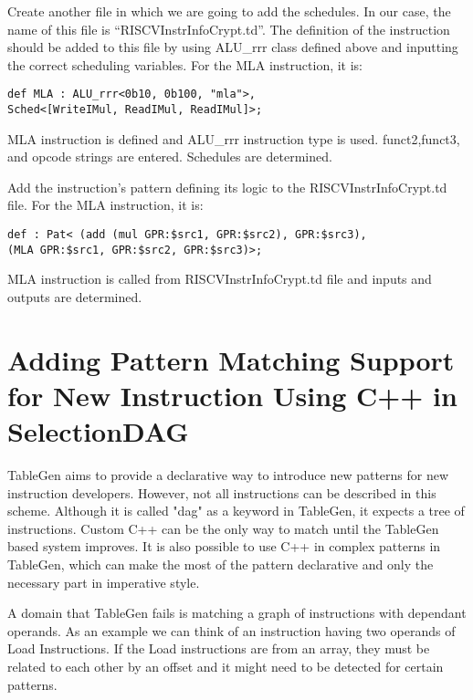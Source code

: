 Create another file in which we are going to add the schedules. In our case, the name of this file is “RISCVInstrInfoCrypt.td”. The definition of the instruction should be added to this file by using ALU\_rrr class defined above and inputting the correct scheduling variables. For the MLA instruction, it is:

\begin{lstlisting}
def MLA : ALU_rrr<0b10, 0b100, "mla">,
Sched<[WriteIMul, ReadIMul, ReadIMul]>;
\end{lstlisting}

MLA instruction is defined and ALU\_rrr instruction type is used. funct2,funct3, and opcode strings are entered. Schedules are determined.

Add the instruction’s pattern defining its logic to the RISCVInstrInfoCrypt.td file. For the MLA instruction, it is:

\begin{lstlisting}
def : Pat< (add (mul GPR:$src1, GPR:$src2), GPR:$src3),
(MLA GPR:$src1, GPR:$src2, GPR:$src3)>;
\end{lstlisting}

MLA instruction is called from RISCVInstrInfoCrypt.td file and inputs and outputs are determined.

\section{Adding Pattern Matching Support for New Instruction Using C++ in SelectionDAG}
TableGen aims to provide a declarative way to introduce new patterns for new instruction developers. However, not all instructions can be described in this scheme.  Although it is called "dag" as a keyword in TableGen, it expects a tree of instructions. Custom C++ can be the only way to match until the TableGen based system improves. It is also possible to use C++ in complex patterns in TableGen, which can make the most of the pattern declarative and only the necessary part in imperative style.
\par
A domain that TableGen fails is matching a graph of instructions with dependant operands. As an example we can think of an instruction having two operands of Load Instructions. If the Load instructions are from an array, they must be related to each other by an offset and it might need to be detected for certain patterns.




